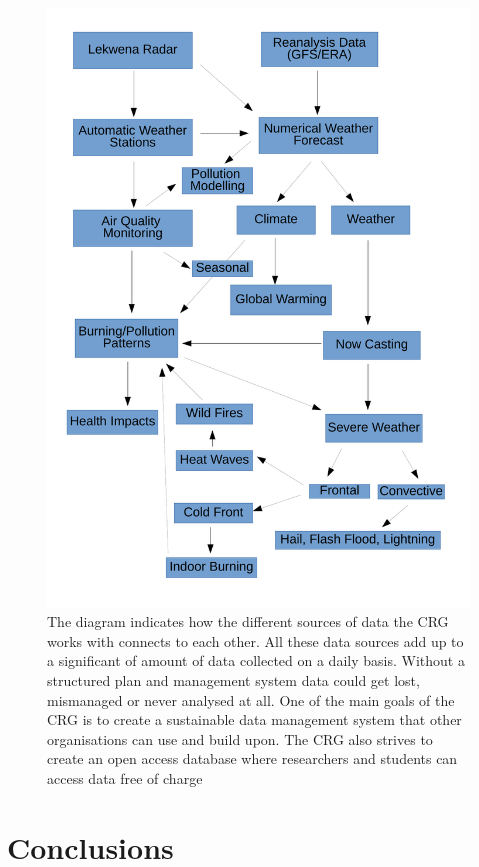 \documentclass{wrcreport}
\begin{document}
\begin{figure}[htp]
\includegraphics[width=\textwidth]{intersectional.pdf}
\caption[NWU CRG Resrearch Intersections]{The diagram indicates how
the different sources of data the CRG works with connects to each
other. All these data sources add up to a significant of amount of
data collected on a daily basis. Without a structured plan and
management system data could get lost, mismanaged or never analysed at
all. One of the main goals of the CRG is to create a sustainable data
management system that other organisations can use and build upon. The
CRG also strives to create an open access database where researchers
and students can access data free of charge} \label{fig:data}
\end{figure}

\chapter{Conclusions}
\end{document}
